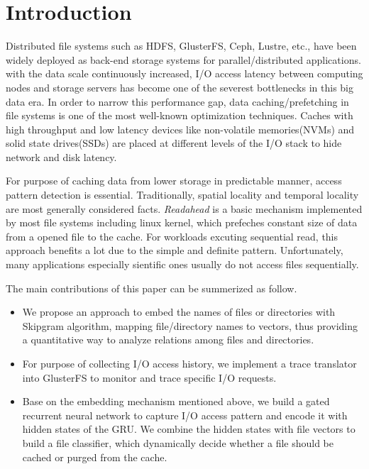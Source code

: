 \documentclass[conference]{IEEEtran}
\begin{document}
\section{Introduction}
Distributed file systems such as HDFS\cite{HDFS}, GlusterFS\cite{GlusterFS}, Ceph\cite{Ceph}, Lustre\cite{Lustre}, etc., have been widely deployed as back-end storage systems for parallel/distributed applications.
with the data scale continuously increased, I/O access latency between computing nodes and storage servers has become one of the severest bottlenecks in this big data era.
In order to narrow this performance gap, data caching/prefetching in file systems is one of the most well-known optimization techniques.
Caches with high throughput and low latency devices like non-volatile memories(NVMs) and solid state drives(SSDs) are placed at different levels of the I/O stack to hide network and disk latency.

For purpose of caching data from lower storage in predictable manner, access pattern detection is essential.
Traditionally, spatial locality and temporal locality are most generally considered facts. 
\textit{Readahead} is a basic mechanism implemented by most file systems\cite{WhyDoes} including linux kernel, which prefeches constant size of data from a opened file to the cache. 
For workloads excuting sequential read, this approach benefits a lot due to the simple and definite pattern.
Unfortunately, many applications especially sientific ones usually do not access files sequentially.

The main contributions of this paper can be summerized as follow.
\begin{itemize}
    \item We propose an approach to embed the names of files or directories with Skipgram algorithm, 
    mapping file/directory names to vectors, thus providing a quantitative way to analyze relations among files and directories.
    \item For purpose of collecting I/O access history, we implement a trace translator into GlusterFS to monitor and trace specific I/O requests.
    \item Base on the embedding mechanism mentioned above, we build a gated recurrent neural network to capture I/O access pattern and encode it with hidden states of the GRU.
    We combine the hidden states with file vectors to build a file classifier, which dynamically decide whether a file should be cached or purged from the cache.

\end{itemize}
\end{document}
